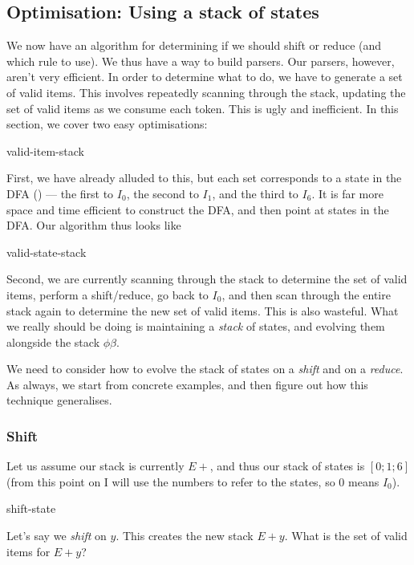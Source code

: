 \subsection{Optimisation: Using a stack of states}\label{section:lr-stack-state}
We now have an algorithm for determining if we should shift or reduce (and which rule to use). We thus have a way to build parsers. Our parsers, however, aren't very efficient. In order to determine what to do, we have to generate a set of valid items. This involves repeatedly scanning through the stack, updating the set of valid items as we consume each token. This is ugly and inefficient. In this section, we cover two easy optimisations:

\begin{center}
    {valid-item-stack}
\end{center}

First, we have already alluded to this, but each set corresponds to a state in the DFA () --- the first to $I_0$, the second to $I_1$, and the third to $I_6$. It is far more space and time efficient to construct the DFA, and then point at states in the DFA. Our algorithm thus looks like

\begin{center}
    {valid-state-stack}
\end{center}

Second, we are currently scanning through the stack to determine the set of valid items, perform a shift/reduce, go back to $I_0$, and then scan through the entire stack again to determine the new set of valid items. This is also wasteful. What we really should be doing is maintaining a \textit{stack} of states, and evolving them alongside the stack $\phi\beta$. 

We need to consider how to evolve the stack of states on a \textit{shift} and on a \textit{reduce}. As always, we start from concrete examples, and then figure out how this technique generalises.

\subsubsection{Shift}
Let us assume our stack is currently $E+$, and thus our stack of states is $[0;1;6]$ (from this point on I will use the numbers to refer to the states, so $0$ means $I_0$). 
\begin{center}
    {shift-state}
\end{center}
Let's say we \textit{shift} on $y$. This creates the new stack $E+y$. What is the set of valid items for $E+y$?

